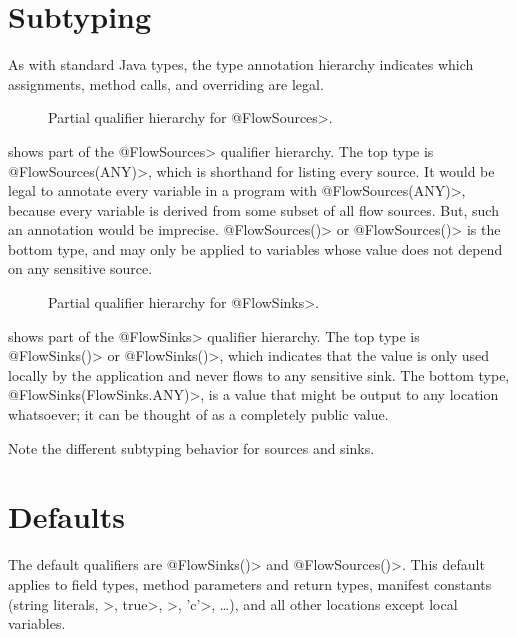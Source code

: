 \section{Subtyping}

As with standard Java types, the type annotation hierarchy indicates which
assignments, method calls, and overriding are legal.


\begin{figure}
\caption{Partial qualifier hierarchy for \<@FlowSources>.}
\label{fig:flowsources-hierarchy}
\end{figure}

 shows part of the \<@FlowSources>
qualifier hierarchy.  The top type is \<@FlowSources(ANY)>, which is
shorthand for listing every source.  It would be legal to annotate every
variable in a program with \<@FlowSources(ANY)>, because every variable is
derived from some subset of all flow sources.  But, such an annotation
would be imprecise.  \<@FlowSources(\ttcbs)> or \<@FlowSources()> is the
bottom type, and may only
be applied to variables whose value does not depend on any sensitive
source.


\begin{figure}
\caption{Partial qualifier hierarchy for \<@FlowSinks>.}
\label{fig:flowsinks-hierarchy}
\end{figure}

 shows part of the \<@FlowSinks>
qualifier hierarchy.  The top type is \<@FlowSinks(\ttcbs)> or
\<@FlowSinks()>, which indicates
that the value is only used locally by the application and never flows to
any sensitive sink.  The bottom type, \<@FlowSinks(FlowSinks.ANY)>, is a
value that might be output to any location whatsoever; it can be thought of
as a completely public value.

Note the different subtyping behavior for sources and sinks.


\section{Defaults\label{flow-defaults}}

The default qualifiers are \<@FlowSinks({})> and \<@FlowSources({})>.  This
default applies to field types, method parameters and return types,
manifest constants
(string literals, >, \<true>, >, \<'c'>,
\ldots), and all other locations except local variables.


